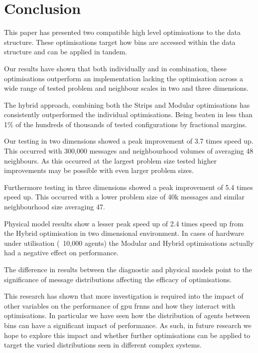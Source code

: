 \section{Conclusion\label{sec:conclusion}}
  This paper has presented two compatible high level optimisations to the  data structure. These optimisations target how bins are accessed within the data structure and can be applied in tandem.
  
  Our results have shown that both individually and in combination, these optimisations outperform an implementation lacking the optimisation across a wide range of tested problem and neighbour scales in two and three dimensions.
  
  The hybrid approach, combining both the Strips and Modular optimisations has consistently outperformed the individual optimisations. Being beaten in less than 1\% of the hundreds of thousands of tested configurations by fractional margins.
  
  Our testing in two dimensions showed a peak improvement of 3.7 times speed up. This occurred with 300,000 messages and neighbourhood volumes of averaging 48 neighbours. As this occurred at the largest problem size tested higher improvements may be possible with even larger problem sizes.

  Furthermore testing in three dimensions showed a peak improvement of 5.4 times speed up. This occurred with a lower problem size of 40k messages and similar neighbourhood size averaging 47.
  
  Physical model results show a lesser peak speed up of 2.4 times speed up from the Hybrid optimisation in two dimensional environment. In cases of hardware under utilisation (~10,000 agents) the Modular and Hybrid optimisations actually had a negative effect on performance.
  
  The difference in results between the diagnostic and physical models point to the significance of message distributions affecting the efficacy of optimisations.
  
  This research has shown that more investigation is required into the impact of other variables on the performance of \gls{gpu} \gls{frnns} and how they interact with optimisations. In particular we have seen how the distribution of agents between bins can have a significant impact of performance. As such, in future research we hope to explore this impact and whether further optimisations can be applied to target the varied distributions seen in different complex systems.
  
